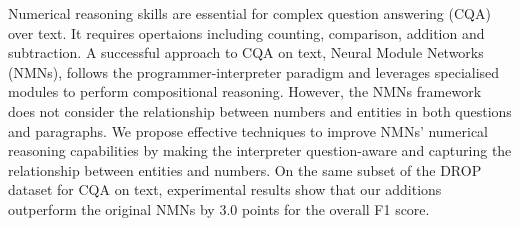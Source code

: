 Numerical reasoning skills are essential for complex question answering (CQA) over text. It requires opertaions including counting, comparison, addition and subtraction.  A successful approach to CQA on text, Neural Module Networks (NMNs), follows the programmer-interpreter paradigm and leverages specialised modules to perform compositional reasoning. However, the NMNs framework does not consider the relationship between numbers and entities in both questions and paragraphs. We propose effective techniques to improve NMNs' numerical reasoning capabilities by making the interpreter question-aware and capturing the relationship between entities and numbers. On the same subset of the DROP dataset for CQA on text, experimental results show that our additions outperform the original NMNs by 3.0 points for the overall F1 score.

